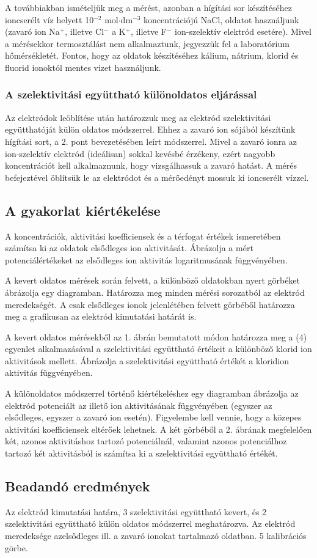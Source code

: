 A továbbiakban ismételjük meg a mérést, azonban a hígítási sor készítéséhez ioncserélt víz helyett 10$^{-2}$ mol$\cdot$dm$^{-3}$ koncentrációjú NaCl, oldatot használjunk (zavaró ion Na$^+$, illetve Cl$^-$ a K$^+$, illetve F$^-$ ion-szelektív elektród esetére).
Mivel a mérésekkor termosztálást nem alkalmaztunk, jegyezzük fel a laboratórium hőmérsékletét.
Fontos, hogy az oldatok készítéséhez kálium, nátrium, klorid és fluorid ionoktól mentes vizet használjunk.

\subsubsection{A szelektivitási együttható különoldatos eljárással}

Az elektródok leöblítése után határozzuk meg az elektród szelektivitási együtthatóját külön oldatos módszerrel.
Ehhez a zavaró ion sójából készítünk hígítási sort, a 2. pont bevezetésében leírt módszerrel.
Mivel a zavaró ionra az ion-szelektív elektród (ideálisan) sokkal kevésbé érzékeny, ezért nagyobb koncentrációt kell alkalmaznunk, hogy vizsgálhassuk a zavaró hatást.
A mérés befejeztével öblítsük le az elektródot és a mérőedényt mossuk ki ioncserélt vízzel.

\subsection{A gyakorlat kiértékelése}

A koncentrációk, aktivitási koefficiensek és a térfogat értékek ismeretében számítsa ki az oldatok elsődleges ion aktivitását.
Ábrázolja a mért potenciálértékeket az elsődleges ion aktivitás logaritmusának függvényében.

A kevert oldatos mérések során felvett, a különböző oldatokban nyert görbéket ábrázolja egy diagramban.
Határozza meg minden mérési sorozatból az elektród meredekségét.
A csak elsődleges ionok jelenlétében felvett görbéből határozza meg a grafikusan az elektród kimutatási határát is.

A kevert oldatos mérésekből az 1. ábrán bemutatott módon határozza meg a (4) egyenlet alkalmazásával a szelektivitási együttható értékeit a különböző klorid ion aktivitások mellett.
Ábrázolja a szelektivitási együttható értékét a kloridion aktivitás függvényében.

A különoldatos módszerrel történő kiértékeléshez egy diagramban ábrázolja az elektród potenciált az illető ion aktivitásának függvényében (egyszer az elsődleges, egyszer a zavaró ion esetén).
Figyelembe kell vennie, hogy a közepes aktivitási koefficiensek eltérőek lehetnek.
A két görbéből a 2. ábrának megfelelően két, azonos aktivitáshoz tartozó potenciálnál, valamint azonos potenciálhoz tartozó két aktivitásból is számítsa ki a szelektivitási együttható értékét.

\subsection{Beadandó eredmények}
Az elektród kimutatási határa, 3 szelektivitási együttható kevert, és 2 szelektivitási együttható külön oldatos módszerrel meghatározva.
Az elektród meredeksége azelsődleges ill. a zavaró ionokat tartalmazó oldatban. 5 kalibrációs görbe.

